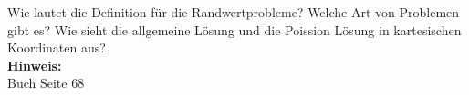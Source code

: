 \begin{question}[section=3,subsection=31,name={Randwertprobleme},difficulty=7,type=mdl,tags={}]
	Wie lautet die Definition für die Randwertprobleme? Welche Art von Problemen gibt es? Wie sieht die allgemeine Lösung und die Poission Lösung in kartesischen Koordinaten aus?
	\\ \textbf{Hinweis:}\\
	Buch Seite 68
\end{question}
\begin{solution}
	
\end{solution}